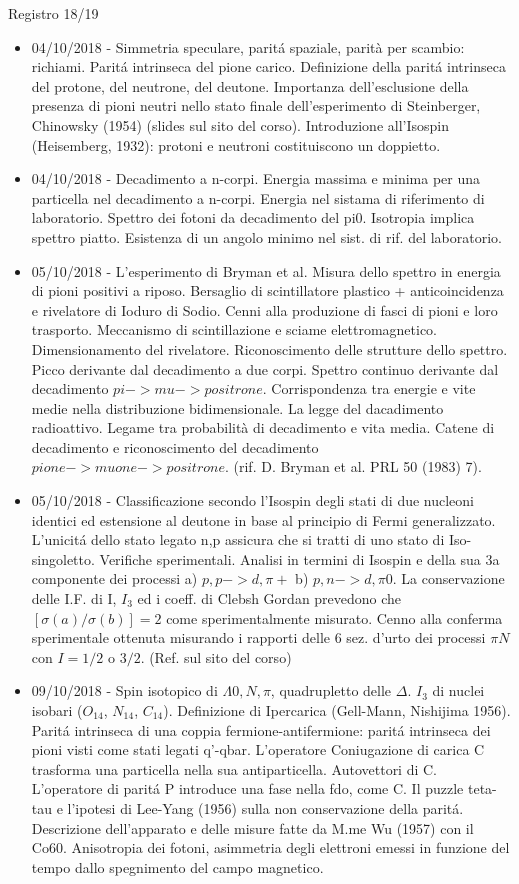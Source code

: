 \begin{frame}[allowframebreaks]{Registro 18/19}
\begin{itemize}
\item 04/10/2018 - Simmetria speculare, parit\'a spaziale, parità per scambio: richiami. Parit\'a intrinseca del pione carico. Definizione della parit\'a intrinseca del protone, del neutrone, del deutone. Importanza dell'esclusione della presenza di pioni neutri nello stato finale dell'esperimento di Steinberger, Chinowsky (1954) (slides sul sito del corso). Introduzione all'Isospin (Heisemberg, 1932): protoni e neutroni costituiscono un doppietto.
\item 04/10/2018 - Decadimento a n-corpi. Energia massima e minima per una particella nel decadimento a n-corpi. Energia nel sistama di riferimento di laboratorio. Spettro dei fotoni da decadimento del pi0. Isotropia implica spettro piatto. Esistenza di un angolo minimo nel sist. di rif. del laboratorio.
\item 05/10/2018 - L'esperimento di Bryman et al. Misura dello spettro in energia di pioni positivi a riposo. Bersaglio di scintillatore plastico + anticoincidenza e rivelatore di Ioduro di Sodio. Cenni alla produzione di fasci di pioni e loro trasporto. Meccanismo di scintillazione e sciame elettromagnetico. Dimensionamento del rivelatore. Riconoscimento delle strutture dello spettro. Picco derivante dal decadimento a due corpi. Spettro continuo derivante dal decadimento $pi -> mu -> positrone$. Corrispondenza tra energie e vite medie nella distribuzione bidimensionale. La legge del dacadimento radioattivo. Legame tra probabilità di decadimento e vita media. Catene di decadimento e riconoscimento del decadimento $pione->muone->positrone$. (rif. D. Bryman et al. PRL 50 (1983) 7).
\item 05/10/2018 - Classificazione secondo l'Isospin degli stati di due nucleoni identici ed estensione al deutone in base al principio di Fermi generalizzato. L'unicit\'a dello stato legato n,p assicura che si tratti di uno stato di Iso-singoletto. Verifiche sperimentali. Analisi in termini di Isospin e della sua 3a componente dei processi a) $p,p->d,\pi+$ b) $p,n-> d,\pi0$. La conservazione delle I.F. di I, $I_3$ ed i coeff. di Clebsh Gordan prevedono che $[\sigma(a)/\sigma(b)]=2$ come sperimentalmente misurato. Cenno alla conferma sperimentale ottenuta misurando i rapporti delle 6 sez. d'urto dei processi $\pi N$ con $I=1/2$ o $3/2$. (Ref. sul sito del corso)
\item 09/10/2018 - Spin isotopico di $\Lambda0, N, \pi$, quadrupletto delle $\Delta$. $I_3$ di nuclei isobari ($O_{14}$, $N_{14}$, $C_{14}$). Definizione di Ipercarica (Gell-Mann, Nishijima 1956). Parit\'a intrinseca di una coppia fermione-antifermione: parit\'a intrinseca dei pioni visti come stati legati q'-qbar. L'operatore Coniugazione di carica C trasforma una particella nella sua antiparticella. Autovettori di C. L'operatore di parit\'a P introduce una fase nella fdo, come C. Il puzzle teta-tau e l'ipotesi di Lee-Yang (1956) sulla non conservazione della parit\'a. Descrizione dell'apparato e delle misure fatte da M.me Wu (1957) con il Co60. Anisotropia dei fotoni, asimmetria degli elettroni emessi in funzione del tempo dallo spegnimento del campo magnetico.

\end{itemize}
\end{frame}
